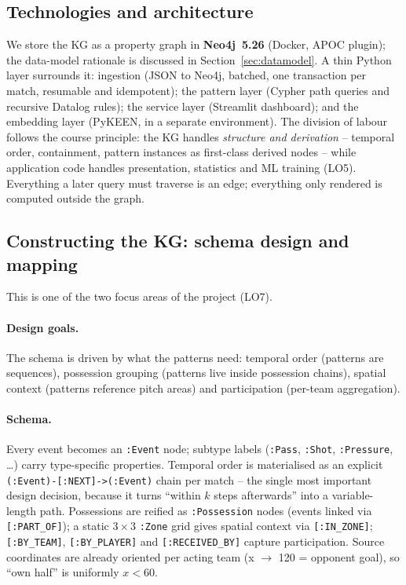\documentclass[11pt,a4paper]{article}
\begin{document}
\subsection{Technologies and architecture}

We store the KG as a property graph in \textbf{Neo4j~5.26} (Docker, APOC
plugin); the data-model rationale is discussed in
Section~\ref{sec:datamodel}. A thin Python layer surrounds it: ingestion (JSON
to Neo4j, batched, one transaction per match, resumable and idempotent); the
pattern layer (Cypher path queries and recursive Datalog rules); the service
layer (Streamlit dashboard); and the embedding layer (PyKEEN, in a separate
environment). The division of labour follows the course principle: the KG
handles \emph{structure and derivation} -- temporal order, containment, pattern
instances as first-class derived nodes -- while application code handles
presentation, statistics and ML training (LO5). Everything a later query must
traverse is an edge; everything only rendered is computed outside the graph.


\subsection{Constructing the KG: schema design and mapping}
\label{sec:construction}

This is one of the two focus areas of the project (LO7).

\paragraph{Design goals.} The schema is driven by what the patterns need:
temporal order (patterns are sequences), possession grouping (patterns live
inside possession chains), spatial context (patterns reference pitch areas) and
participation (per-team aggregation).

\paragraph{Schema.} Every event becomes an \texttt{:Event} node; subtype labels
(\texttt{:Pass}, \texttt{:Shot}, \texttt{:Pressure}, \dots) carry type-specific
properties. Temporal order is materialised as an explicit
\texttt{(:Event)-[:NEXT]->(:Event)} chain per match -- the single most important
design decision, because it turns ``within $k$ steps afterwards'' into a
variable-length path. Possessions are reified as \texttt{:Possession} nodes
(events linked via \texttt{[:PART\_OF]}); a static $3\times3$ \texttt{:Zone}
grid gives spatial context via \texttt{[:IN\_ZONE]}; \texttt{[:BY\_TEAM]},
\texttt{[:BY\_PLAYER]} and \texttt{[:RECEIVED\_BY]} capture participation. Source
coordinates are already oriented per acting team (x $\to$ 120 = opponent goal),
so ``own half'' is uniformly $x < 60$.
\end{document}
